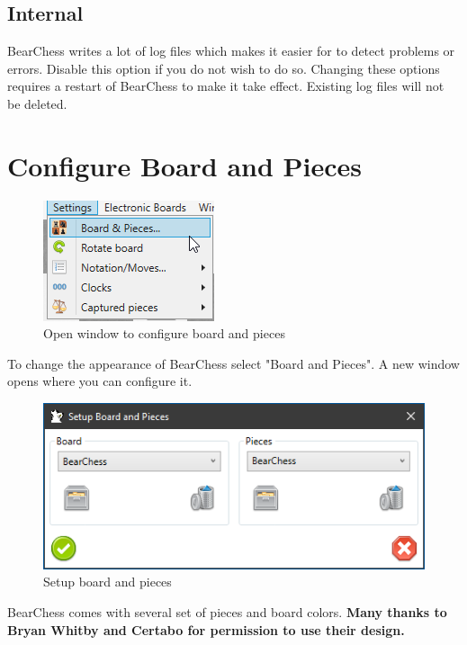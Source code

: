 \documentclass[11pt,a4paper]{article}
\begin{document}
	\subsection{Internal}
	BearChess writes a lot of log files which makes it easier for to detect problems or errors.
	Disable this option if you do not wish to do so. Changing these options requires a restart of BearChess to make it take effect. Existing log files will not be deleted.
	
	
	\section{Configure Board and Pieces} \label{BoardAndPieces}
	
	\begin{figure}[H]
		\centering
		\includegraphics[scale=1.0]{SettingsBoardAndPieces.png}
		\caption{Open window to configure board and pieces }
		\label{fig:SettingsBoardAndPieces}
	\end{figure}
	
	To change the appearance of BearChess select "Board and Pieces". A new window opens where you can configure it. 
	
	\begin{figure}[H]
		\centering
		\includegraphics[scale=0.9]{SettingsBoardAndPieces2.png}
		\caption{Setup board and pieces }
		\label{fig:SettingsBoardAndPieces2}
	\end{figure}
	
	BearChess comes with several set of pieces and board colors. \textbf{Many thanks to Bryan Whitby and Certabo for permission to use their design.}
	
\end{document}
